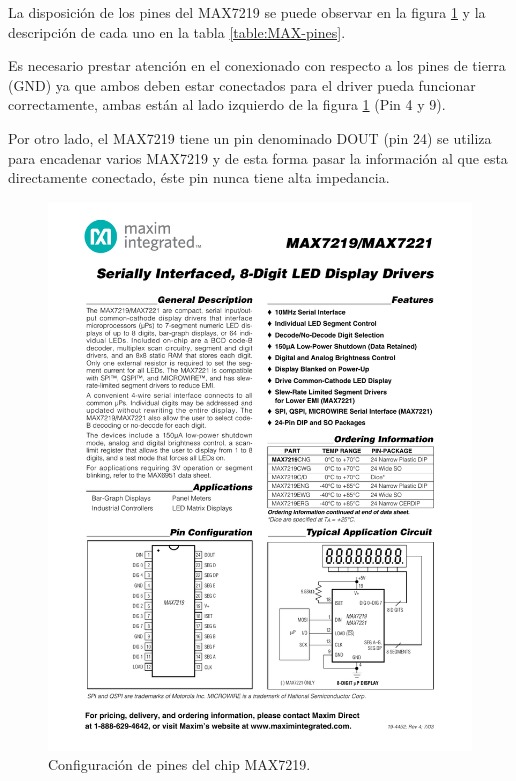 La disposición de los pines del MAX7219 se puede observar en la figura \ref{fig:MAX-pines} y la descripción de cada uno en la tabla \ref{table:MAX-pines}.

Es necesario prestar atención en el conexionado con respecto a los pines de tierra (GND) ya que ambos deben estar conectados para el driver pueda funcionar correctamente, ambas están al lado izquierdo de la figura \ref{fig:MAX-pines} (Pin 4 y 9).

Por otro lado, el MAX7219 tiene un pin denominado DOUT (pin 24) se utiliza para encadenar varios MAX7219 y de esta forma pasar la información al que esta directamente conectado, éste pin nunca tiene alta impedancia.

\begin{figure}[htp!]
	\centering
	\begin{center}
	\includegraphics[scale=1.2]{imagenes/hw/max.pdf}
	 \caption{Configuración de pines del chip MAX7219.}
	  \label{fig:MAX-pines}
	\end{center}
\end{figure}

